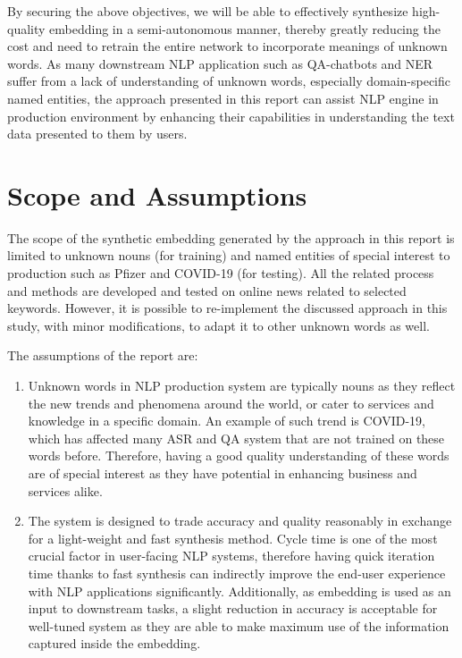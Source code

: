 By securing the above objectives, we will be able to effectively synthesize high-quality embedding in a semi-autonomous manner, thereby greatly reducing the cost and need to retrain the entire network to incorporate meanings of unknown words. As many downstream NLP application such as QA-chatbots and NER suffer from a lack of understanding of unknown words, especially domain-specific named entities, the approach presented in this report can assist NLP engine in production environment by enhancing their capabilities in understanding the text data presented to them by users. 


\newpage

\section{Scope and Assumptions}

The scope of the synthetic embedding generated by the approach in this report is limited to unknown nouns (for training) and named entities of special interest to production such as Pfizer and COVID-19 (for testing). All the related process and methods are developed and tested on online news related to selected keywords. However, it is possible to re-implement the discussed approach in this study, with minor modifications, to adapt it to other unknown words as well. 

The assumptions of the report are:

\begin{enumerate}
    \item Unknown words in NLP production system are typically nouns as they reflect the new trends and phenomena around the world, or cater to services and knowledge in a specific domain. An example of such trend is COVID-19, which has affected many ASR and QA system that are not trained on these words before. Therefore, having a good quality understanding of these words are of special interest as they have potential in enhancing business and services alike. 
    \item The system is designed to trade accuracy and quality reasonably in exchange for a light-weight and fast synthesis method. Cycle time is one of the most crucial factor in user-facing NLP systems, therefore having quick iteration time thanks to fast synthesis can indirectly improve the end-user experience with NLP applications significantly. Additionally, as embedding is used as an input to downstream tasks, a slight reduction in accuracy is acceptable for well-tuned system as they are able to make maximum use of the information captured inside the embedding. 
\end{enumerate}

